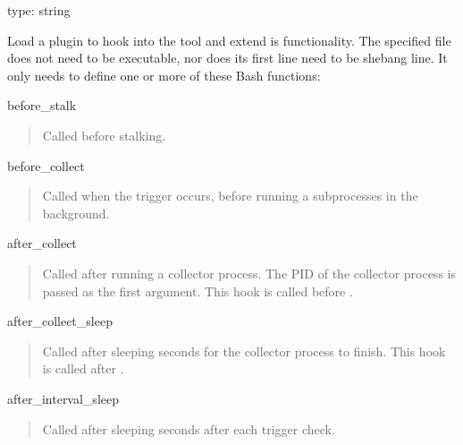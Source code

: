 \documentclass[letterpaper,10pt,english]{sphinxmanual}
\begin{document}
\begin{fulllineitems}
\label{\detokenize{mariadb-stat:cmdoption-mariadb-stat-plugin}}
\sphinxAtStartPar
type: string

\sphinxAtStartPar
Load a plugin to hook into the tool and extend is functionality.
The specified file does not need to be executable, nor does its first line
need to be shebang line.  It only needs to define one or more of these
Bash functions:

\sphinxAtStartPar
before\_stalk
\begin{quote}

\sphinxAtStartPar
Called before stalking.
\end{quote}

\sphinxAtStartPar
before\_collect
\begin{quote}

\sphinxAtStartPar
Called when the trigger occurs, before running a {\hyperref[\detokenize{mariadb-stat:cmdoption-mariadb-stat-collect}]{}}
subprocesses in the background.
\end{quote}

\sphinxAtStartPar
after\_collect
\begin{quote}

\sphinxAtStartPar
Called after running a collector process.  The PID of the collector process
is passed as the first argument.  This hook is called before
.
\end{quote}

\sphinxAtStartPar
after\_collect\_sleep
\begin{quote}

\sphinxAtStartPar
Called after sleeping {\hyperref[\detokenize{mariadb-stat:cmdoption-mariadb-stat-sleep}]{}} seconds for the collector process to finish.
This hook is called after .
\end{quote}

\sphinxAtStartPar
after\_interval\_sleep
\begin{quote}

\sphinxAtStartPar
Called after sleeping {\hyperref[\detokenize{mariadb-stat:cmdoption-mariadb-stat-interval}]{}} seconds after each trigger check.
\end{quote}


\end{fulllineitems}
\end{document}

